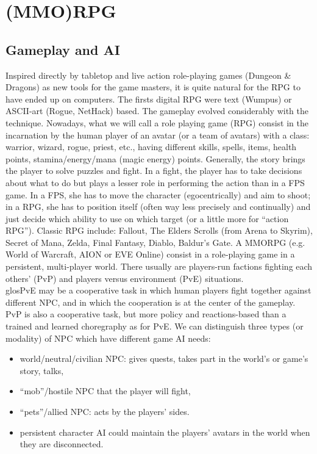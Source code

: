 
\section{(MMO)RPG}

\subsection{Gameplay and AI}
Inspired directly by tabletop and live action role-playing games (Dungeon \& Dragons) as new tools for the game masters, it is quite natural for the RPG to have ended up on computers. The firsts digital RPG were text (Wumpus) or ASCII-art (Rogue, NetHack) based. The gameplay evolved considerably with the technique. Nowadays, what we will call a role playing game (RPG) consist in the incarnation by the human player of an avatar (or a team of avatars) with a class: warrior, wizard, rogue, priest, etc., having different skills, spells, items, health points, stamina/energy/mana (magic energy) points. Generally, the story brings the player to solve puzzles and fight. In a fight, the player has to take decisions about what to do but plays a lesser role in performing the action than in a FPS game. In a FPS, she has to move the character (egocentrically) and aim to shoot; in a RPG, she has to position itself (often way less precisely and continually) and just decide which ability to use on which target (or a little more for ``action RPG''). Classic RPG include: Fallout, The Elders Scrolls (from Arena to Skyrim), Secret of Mana, Zelda, Final Fantasy, Diablo, Baldur's Gate. A MMORPG (e.g. World of Warcraft, AION or EVE Online) consist in a role-playing game in a persistent, multi-player world. There usually are players-run factions fighting each others’ (PvP) and players versus environment (PvE) situations. \\glos{PvE} may be a cooperative task in which human players fight together against different NPC, and in which the cooperation is at the center of the gameplay. PvP is also a cooperative task, but more policy and reactions-based than a trained and learned choregraphy as for PvE. We can distinguish three types (or modality) of NPC which have different game AI needs:
\begin{itemize}
    \item world/neutral/civilian NPC: gives quests, takes part in the world's or game's story, talks,
    \item ``mob''/hostile NPC that the player will fight, 
    \item ``pets''/allied NPC: acts by the players' sides.
    \item persistent character AI could maintain the players' avatars in the world when they are disconnected.
\end{itemize}
